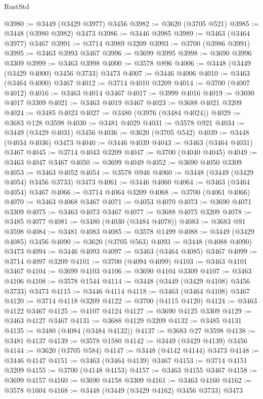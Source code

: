 \begin{lexlean}{RustStd}
\begin{coremodule}
{{{{{{{{{{{{{{{{{{{@3980 := @3449 (@3429 @3977) @3456
@3982 := @3620 (@3705 @521)
@3985 := @3448 (@3980 @3982) @3473
@3986 := @3446 @3985
@3989 := @3463 (@3464 @3977) @3467
@3991 := @3714 @3989 @3209
@3993 := @3700 (@3986 @3991)
@3995 := @3463 @3993 @3467
@3996 := @3699 @3995
@3998 := @3690 @3996 @3309
@3999 := @3463 @3998
@4000 := @3578 @896
@4006 := @3448 (@3449 (@3429 @4000) @3456 @3733) @3473
@4007 := @3446 @4006
@4010 := @3463 (@3464 @4000) @3467
@4012 := @3714 @4010 @3209
@4014 := @3700 (@4007 @4012)
@4016 := @3463 @4014 @3467
@4017 := @3999 @4016
@4019 := @3690 @4017 @3309
@4021 := @3463 @4019 @3467
@4023 := @3688 @4021 @3209
@4024 := @3485 @4023
@4027 := @3480 (@3976 (@3484 @4024))
@4029 := @3683 @128 @3598
@4030 := @3481 @4029
@4031 := @3578 @921
@4034 := @3449 (@3429 @4031) @3456
@4036 := @3620 (@3705 @542)
@4039 := @3448 (@4034 @4036) @3473
@4040 := @3446 @4039
@4043 := @3463 (@3464 @4031) @3467
@4045 := @3714 @4043 @3209
@4047 := @3700 (@4040 @4045)
@4049 := @3463 @4047 @3467
@4050 := @3699 @4049
@4052 := @3690 @4050 @3309
@4053 := @3463 @4052
@4054 := @3578 @946
@4060 := @3448 (@3449 (@3429 @4054) @3456 @3733) @3473
@4061 := @3446 @4060
@4064 := @3463 (@3464 @4054) @3467
@4066 := @3714 @4064 @3209
@4068 := @3700 (@4061 @4066)
@4070 := @3463 @4068 @3467
@4071 := @4053 @4070
@4073 := @3690 @4071 @3309
@4075 := @3463 @4073 @3467
@4077 := @3688 @4075 @3209
@4078 := @3485 @4077
@4081 := @3480 (@4030 (@3484 @4078))
@4083 := @3683 @91 @3598
@4084 := @3481 @4083
@4085 := @3578 @1499
@4088 := @3449 (@3429 @4085) @3456
@4090 := @3620 (@3705 @563)
@4093 := @3448 (@4088 @4090) @3473
@4094 := @3446 @4093
@4097 := @3463 (@3464 @4085) @3467
@4099 := @3714 @4097 @3209
@4101 := @3700 (@4094 @4099)
@4103 := @3463 @4101 @3467
@4104 := @3699 @4103
@4106 := @3690 @4104 @3309
@4107 := @3463 @4106
@4108 := @3578 @1544
@4114 := @3448 (@3449 (@3429 @4108) @3456 @3733) @3473
@4115 := @3446 @4114
@4118 := @3463 (@3464 @4108) @3467
@4120 := @3714 @4118 @3209
@4122 := @3700 (@4115 @4120)
@4124 := @3463 @4122 @3467
@4125 := @4107 @4124
@4127 := @3690 @4125 @3309
@4129 := @3463 @4127 @3467
@4131 := @3688 @4129 @3209
@4132 := @3485 @4131
@4135 := @3480 (@4084 (@3484 @4132))
@4137 := @3683 @27 @3598
@4138 := @3481 @4137
@4139 := @3578 @1580
@4142 := @3449 (@3429 @4139) @3456
@4144 := @3620 (@3705 @584)
@4147 := @3448 (@4142 @4144) @3473
@4148 := @3446 @4147
@4151 := @3463 (@3464 @4139) @3467
@4153 := @3714 @4151 @3209
@4155 := @3700 (@4148 @4153)
@4157 := @3463 @4155 @3467
@4158 := @3699 @4157
@4160 := @3690 @4158 @3309
@4161 := @3463 @4160
@4162 := @3578 @1604
@4168 := @3448 (@3449 (@3429 @4162) @3456 @3733) @3473
}}}}}}}}}}}}}}}}}}}
\end{coremodule}
\end{lexlean}
